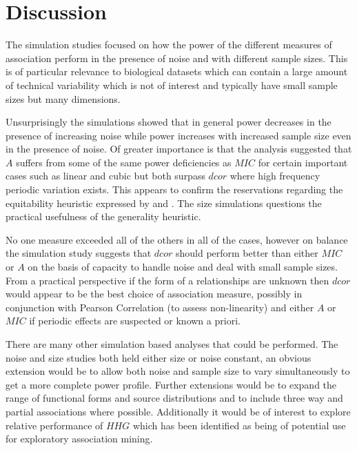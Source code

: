 \documentclass[a4paper, 12pt]{report}
\begin{document}

\section{Discussion}
The simulation studies focused on how the power of the different measures of association perform in the presence of noise and with different sample sizes. This is of particular relevance to biological datasets which can contain a large amount of technical variability which is not of interest and typically have small sample sizes but many dimensions. 

Unsurprisingly the simulations showed that in general power decreases in the presence of increasing noise while power increases with increased sample size even in the presence of noise. Of greater importance is that the analysis suggested that $A$ suffers from some of the same power deficiencies as $MIC$ for certain important cases such as linear and cubic but both surpass $dcor$ where high frequency periodic variation exists. This appears to confirm the reservations regarding the equitability heuristic expressed by \citet{Kinney19082014} and \citet{Tibshirani2011}. The size simulations questions the practical usefulness of the generality heuristic.

No one measure exceeded all of the others in all of the cases, however on balance the simulation study suggests that $dcor$ should perform better than either $MIC$ or $A$ on the basis of capacity to handle noise and deal with small sample sizes. From a practical perspective if the form of a relationships are unknown then $dcor$ would appear to be the best choice of association measure, possibly in conjunction with Pearson Correlation (to assess non-linearity) and either $A$ or $MIC$ if periodic effects are suspected or known a priori.


There are many other simulation based analyses that could be performed. The noise and size studies both held either size or noise constant, an obvious extension would be to allow both noise and sample size to vary simultaneously to get a more complete power profile.  Further extensions would be to expand the range of functional forms and source distributions and to include three way and partial associations where possible. Additionally it would be of interest to explore  relative performance of $HHG$ \cite{HHG} which has been identified as being of potential use for exploratory association mining. 
\end{document}

